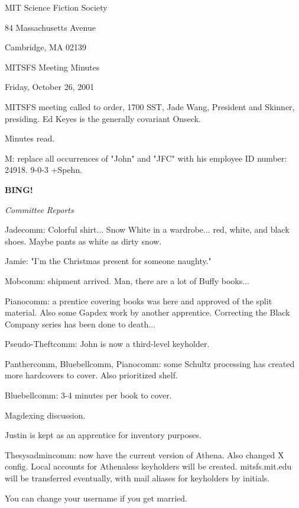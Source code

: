 \documentclass[12pt]{article}
\newcommand{\bing}{{\bf BING!} }
\newcommand{\goto}[1]{\bing \vskip 12pt \centerline{{\em{#1}}}}
\begin{document}
\begin{center}

MIT Science Fiction Society 

84 Massachusetts Avenue

Cambridge, MA 02139

\vspace{12pt}

MITSFS Meeting Minutes 

Friday, October 26, 2001

\end{center}
 
\vspace{18pt}

\setlength{\parskip}{6pt}

\noindent
MITSFS meeting called to order, 1700 SST, Jade Wang, President and
Skinner, presiding.  Ed Keyes is the generally covariant Onseck.

Minutes read.

M: replace all occurrences of "John" and "JFC" with his employee ID number: 24918. 9-0-3 +Spehn.

\goto{Committee Reports}

Jadecomm: Colorful shirt... Snow White in a wardrobe... red, white, and black shoes. Maybe pants as white as dirty snow.

Jamie: "I'm the Christmas present for someone naughty."

Mobcomm: shipment arrived. Man, there are a lot of Buffy books...

Pianocomm: a prentice covering books was here and approved of the split material. Also some Gapdex work by another apprentice. Correcting the Black Company series has been done to death...

Pseudo-Theftcomm: John is now a third-level keyholder.

Panthercomm, Bluebellcomm, Pianocomm: some Schultz processing has created more hardcovers to cover. Also prioritized shelf.

Bluebellcomm: 3-4 minutes per book to cover.

Magdexing discussion.

Justin is kept as an apprentice for inventory purposes.

Thesysadmincomm: now have the current version of Athena. Also changed X config. Local accounts for Athenaless keyholders will be created. mitsfs.mit.edu will be transferred eventually, with mail aliases for keyholders by initials.

You can change your username if you get married.
\end{document}
